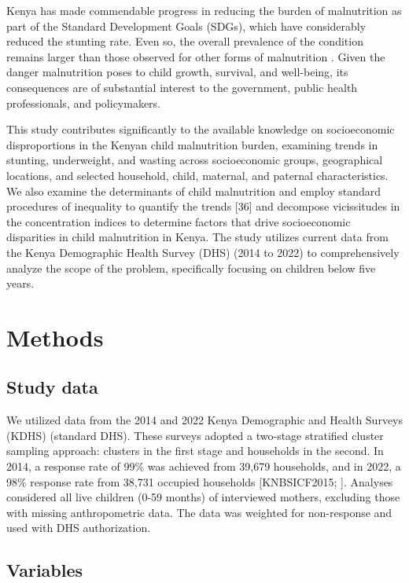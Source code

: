 \documentclass[sn-basic,Numbered,pdflatex]{sn-jnl}
\theoremstyle{remark}
\theoremstyle{definition}
\begin{document}
Kenya has made commendable progress in reducing the burden of
malnutrition as part of the Standard Development Goals (SDGs), which
have considerably reduced the stunting rate. Even so, the overall
prevalence of the condition remains larger than those observed for other
forms of malnutrition \citep{jonah2018, Haddad2015}. Given the danger
malnutrition poses to child growth, survival, and well-being, its
consequences are of substantial interest to the government, public
health professionals, and policymakers.

This study contributes significantly to the available knowledge on
socioeconomic disproportions in the Kenyan child malnutrition burden,
examining trends in stunting, underweight, and wasting across
socioeconomic groups, geographical locations, and selected household,
child, maternal, and paternal characteristics. We also examine the
determinants of child malnutrition and employ standard procedures of
inequality to quantify the trends {[}36{]} and decompose vicissitudes in
the concentration indices to determine factors that drive socioeconomic
disparities in child malnutrition in Kenya. The study utilizes current
data from the Kenya Demographic Health Survey (DHS) (2014 to 2022) to
comprehensively analyze the scope of the problem, specifically focusing
on children below five years.

\hypertarget{sec11}{%
\section{Methods}\label{sec11}}

\hypertarget{study-data}{%
\subsection{Study data}\label{study-data}}

We utilized data from the 2014 and 2022 Kenya Demographic and Health
Surveys (KDHS) (standard DHS). These surveys adopted a two-stage
stratified cluster sampling approach: clusters in the first stage and
households in the second. In 2014, a response rate of 99\% was achieved
from 39,679 households, and in 2022, a 98\% response rate from 38,731
occupied households {[}KNBSICF2015; \citet{KNBSICF2023}{]}. Analyses
considered all live children (0-59 months) of interviewed mothers,
excluding those with missing anthropometric data. The data was weighted
for non-response and used with DHS authorization.

\hypertarget{variables}{%
\subsection{Variables}\label{variables}}
\end{document}

